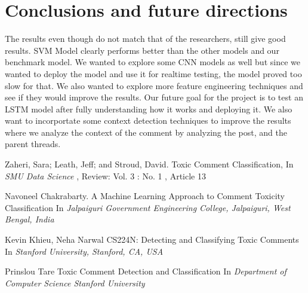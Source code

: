 \documentclass[11pt]{article}
\begin{document}
\section{Conclusions and future directions}
The results even though do not match that of the researchers, still give good results. SVM Model clearly performs better than the other models and our benchmark model. We wanted to explore some CNN models as well but since we wanted to deploy the model and use it for realtime testing, the model proved too slow for that. We also wanted to explore more feature engineering techniques and see if they would improve the results. Our future goal for the project is to test an LSTM model after fully understanding how it works and deploying it. We also want to incorportate some context detection techniques to improve the results where we analyze the context of the comment by analyzing the post, and the parent threads.  	


\begin{thebibliography}{1}

	Zaheri, Sara; Leath, Jeff; and Stroud, David.
	\newblock Toxic Comment Classification,
	\newblock In {\em SMU Data Science 
	}, Review: Vol. 3 : No. 1 , Article 13

	Navoneel Chakrabarty.
	\newblock A Machine Learning Approach to Comment
	Toxicity Classification 
	\newblock In {\em Jalpaiguri Government Engineering College, Jalpaiguri, West Bengal, India}

	Kevin Khieu, Neha Narwal
	\newblock CS224N: Detecting and Classifying Toxic Comments
	\newblock In {\em Stanford University, Stanford, CA, USA}

	Prinslou Tare
	\newblock Toxic Comment Detection and Classiﬁcation
	\newblock In {\em Department of Computer Science
	Stanford University}
\end{thebibliography}
\end{document}
